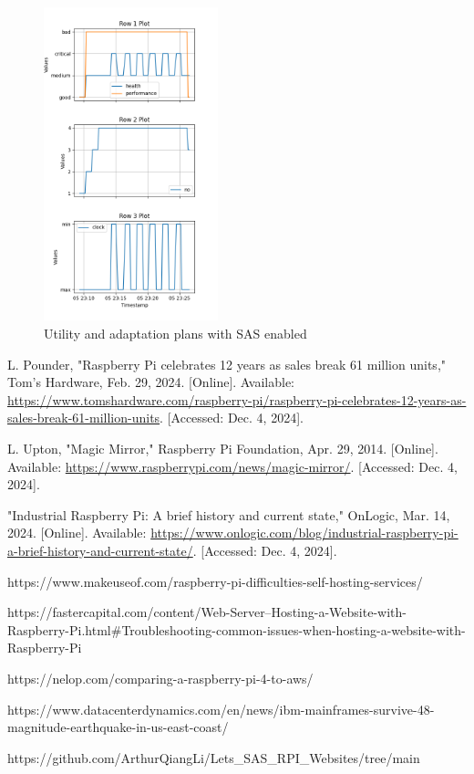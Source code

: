 \documentclass[conference]{IEEEtran}
\begin{document}
\begin{figure}[H]
    \centering
    \includegraphics[width=0.45\textwidth]{./media/after_SAS_utility_and_plans.png}
    \caption{Utility and adaptation plans with SAS enabled}
    \label{fig:after_SAS_utility_and_plans}
\end{figure}

\begin{thebibliography}{00}

     L. Pounder, "Raspberry Pi celebrates 12 years as sales break 61 million units," Tom's Hardware, Feb. 29, 2024. [Online]. Available: \url{https://www.tomshardware.com/raspberry-pi/raspberry-pi-celebrates-12-years-as-sales-break-61-million-units}. [Accessed: Dec. 4, 2024].

     L. Upton, "Magic Mirror," Raspberry Pi Foundation, Apr. 29, 2014. [Online]. Available: \url{https://www.raspberrypi.com/news/magic-mirror/}. [Accessed: Dec. 4, 2024].

     "Industrial Raspberry Pi: A brief history and current state," OnLogic, Mar. 14, 2024. [Online]. Available: \url{https://www.onlogic.com/blog/industrial-raspberry-pi-a-brief-history-and-current-state/}. [Accessed: Dec. 4, 2024].

     https://www.makeuseof.com/raspberry-pi-difficulties-self-hosting-services/

     https://fastercapital.com/content/Web-Server--Hosting-a-Website-with-Raspberry-Pi.html\#Troubleshooting-common-issues-when-hosting-a-website-with-Raspberry-Pi

     https://nelop.com/comparing-a-raspberry-pi-4-to-aws/

     https://www.datacenterdynamics.com/en/news/ibm-mainframes-survive-48-magnitude-earthquake-in-us-east-coast/

     https://github.com/ArthurQiangLi/Lets\_SAS\_RPI\_Websites/tree/main


\end{thebibliography}
\end{document}
